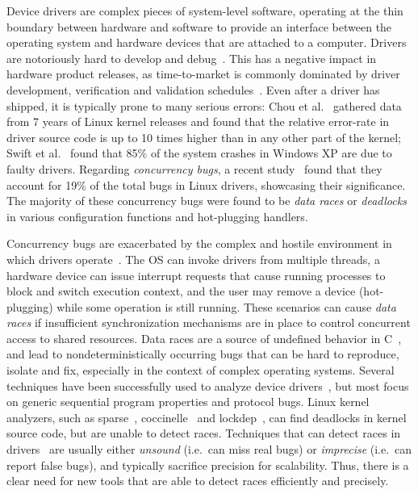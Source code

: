 Device drivers are complex pieces of system-level software, operating at the thin boundary between hardware and software to provide an interface between the operating system and hardware devices that are attached to a computer. Drivers are notoriously hard to develop and debug~\cite{corbet2005linux}. This has a negative impact in hardware product releases, as time-to-market is commonly dominated by driver development, verification and validation schedules~\cite{yavatkar2012era}.
%
Even after a driver has shipped, it is typically prone to many serious errors: Chou et al.~\cite{chou2001empirical} gathered data from 7 years of Linux kernel releases and found that the relative error-rate in driver source code is up to 10 times higher than in any other part of the kernel; Swift et al.~\cite{Swift2003windowsxp} found that 85\% of the system crashes in Windows XP are due to faulty drivers. Regarding \emph{concurrency bugs}, a recent study~\cite{ryzhyk2009dingo} found that they account for 19\% of the total bugs in Linux drivers, showcasing their significance. The majority of these concurrency bugs were found to be \emph{data races} or \emph{deadlocks} in various configuration functions and hot-plugging handlers.

Concurrency bugs are exacerbated by the complex and hostile environment in which drivers operate~\cite{corbet2005linux}. The OS can invoke drivers from multiple threads, a hardware device can issue interrupt requests that cause running processes to block and switch execution context, and the user may remove a device (hot-plugging) while some operation is still running.  These scenarios can cause \emph{data races} if insufficient synchronization mechanisms are in place to control concurrent access to shared resources.
%
Data races are a source of undefined behavior in C~\cite[p.\ 38]{iso/iec11}, and lead to nondeterministically occurring bugs that can be hard to reproduce, isolate and fix, especially in the context of complex operating systems.
%
Several techniques have been successfully used to analyze device drivers~\cite{ball2006thorough, clarke2004predicate, engler2000checking, henzinger2002temporal, cook2006termination, kuznetsov2010testing, renzelmann2012symdrive, lal2012corral}, but most focus on generic sequential program properties and protocol bugs. Linux kernel analyzers, such as sparse~\cite{corbet2004sparse}, coccinelle~\cite{padioleau2008doc} and lockdep~\cite{corbet2006lock}, can find deadlocks in kernel source code, but are unable to detect races. Techniques that can detect races in drivers~\cite{dawson2003racerx, qadeer2004kiss, pratikakis2006locksmith, voung2007relay, lal2012corral} are usually either \emph{unsound} (i.e.\ can miss real bugs) or \emph{imprecise} (i.e.\ can report false bugs), and typically sacrifice precision for scalability. Thus, there is a clear need for new tools that are able to detect races efficiently and precisely.

